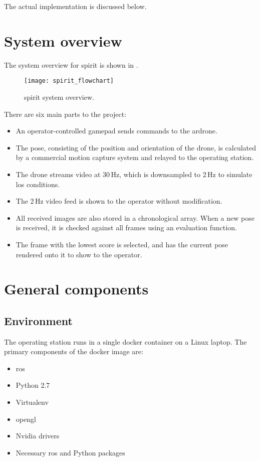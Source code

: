   The actual implementation is discussed below.

\chapter{System overview}
  The system overview for \gls{spirit} is shown in .

  \begin{figure}[h]
    \centering
    \texttt{[image: spirit\_flowchart]}
    \caption[SPIRIT system overview]{\gls{spirit} system overview.}
    \label{fig:spirit_flowchart}
  \end{figure}

  There are six main parts to the project:

  \begin{itemize}
    \item An operator-controlled gamepad sends commands to the \gls{ardrone}.
    \item The pose, consisting of the position and orientation of the drone, is calculated by a commercial motion capture system and relayed to the operating station.
    \item The drone streams video at 30\,Hz, which is downsampled to 2\,Hz to simulate \gls{los} conditions.
    \item The 2\,Hz video feed is shown to the operator without modification.
    \item All received images are also stored in a chronological array.
	  When a new pose is received, it is checked against all frames using an evaluation function.
    \item The frame with the lowest score is selected, and has the current pose rendered onto it to show to the operator.
  \end{itemize}

\chapter{General components}
  \section{Environment}
    The operating station runs in a single \gls{docker} container on a Linux laptop.
    The primary components of the \gls{docker} image are:

    \begin{itemize}
      \item \gls{ros}
      \item Python 2.7
      \item Virtualenv
      \item \gls{opengl}
      \item Nvidia drivers
      \item Necessary \gls{ros} and Python packages
    \end{itemize}

